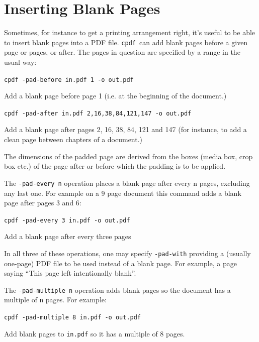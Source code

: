 \documentclass{book}
\newcommand{\cpdf}{\texttt{cpdf}}
\begin{document}
  \section{Inserting Blank Pages}
  Sometimes, for instance to get a printing arrangement right, it's useful to
be able to insert blank pages into a PDF file. \cpdf\ can add blank pages
before a given page or pages, or after. The pages in question are specified by
a range in the usual way:
  \begin{framed}
    \noindent\small\verb!cpdf -pad-before in.pdf 1 -o out.pdf!
 
    \vspace{2.5mm}
    \noindent Add a blank page before page 1 (i.e. at the beginning of the document.)

    \vspace{2.5mm}
    \noindent\verb!cpdf -pad-after in.pdf 2,16,38,84,121,147 -o out.pdf!

    \vspace{2.5mm}
    \noindent Add a blank page after pages 2, 16, 38, 84, 121 and 147 (for
instance, to add a clean page between chapters of a document.)
  \end{framed}
  \noindent The dimensions of the padded page are derived from the boxes (media box, crop box etc.) of the page after or before which the padding is to be applied.

  The \verb!-pad-every n! operation places a blank page after every n pages, excluding any last one. For example on a 9 page document this command adds a blank page after pages 3 and 6:
  \begin{framed}
    \noindent\small\verb!cpdf -pad-every 3 in.pdf -o out.pdf!
 
    \vspace{2.5mm}
    \noindent Add a blank page after every three pages
  \end{framed}
  

\noindent In all three of these operations, one may specify \texttt{-pad-with} providing a (usually one-page)  PDF file to be used instead of a blank page. For example, a page saying ``This page left intentionally blank''.

  The \verb!-pad-multiple n! operation adds blank pages so the document has a multiple of \verb!n! pages. For example:
  \begin{framed}
    \noindent\small\verb!cpdf -pad-multiple 8 in.pdf -o out.pdf!
 
    \vspace{2.5mm}
    \noindent Add blank pages to \texttt{in.pdf} so it has a multiple of 8 pages. 
  \end{framed}
 
\end{document}
